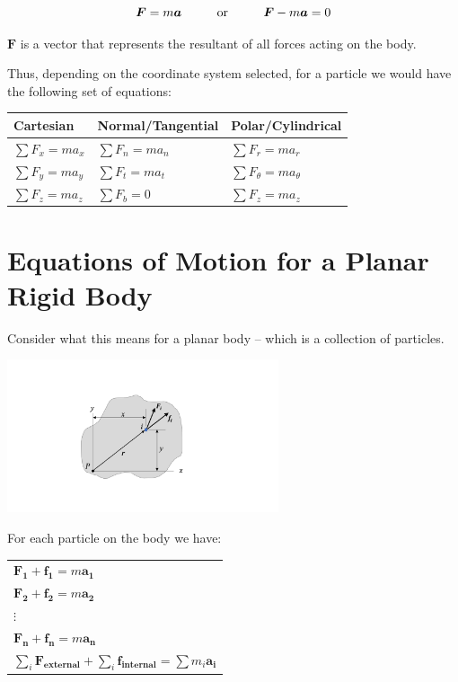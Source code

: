 \documentclass[12pt,letterpaper,twoside]{report}
\begin{document}
\vspace*{7\baselineskip}

\[ 
\bm{F} = m\bm{a} \hspace{1 cm} \text{or} \hspace{1 cm} \bm{F} - m\bm{a} = 0
\]

$\bm{F}$ is a vector that represents the resultant of all forces acting on the body.  

Thus, depending on the coordinate system selected, for a particle we would have the following set of equations:

\begin{center}
\begin{tabu} to 1\textwidth {  | X[1, c]  | X[1, c] | X[1, c] | }
\hline
Cartesian & Normal/Tangential & Polar/Cylindrical\\
\hline
$\sum F_x = m a_x $ & $\sum F_n = m a_n $ & $\sum F_r = m a_r $\\
$\sum F_y = m a_y$ & $\sum F_t = m a_t$ & $\sum F_{\theta} = m a_{\theta}$\\
$\sum F_z = m a_z$ & $\sum F_b = 0$ &$\sum F_z = m a_z$ \\
\hline
\end{tabu}
\end{center}

\newpage

\section{Equations of Motion for a Planar Rigid Body}
Consider what this means for a planar body – which is a collection of particles. 

\includegraphics[trim={5cm 1cm 5cm 1cm},clip,width=0.6\textwidth, center]{Slide50} 

For each particle on the body we have:
\begin{center}
\begin{tabu} to .5\textwidth {   X[1, c]   }

$ \bm{F_1} + \bm{f_1} = m \bm{a_1} $ \\
$ \bm{F_2} + \bm{f_2} = m \bm{a_2} $\\
 $\vdots$  \\
$ \bm{F_n} + \bm{f_n} = m \bm{a_n} $ \\
\hline
$ \displaystyle \sum_i \bm{F_{external}} + \sum_i \bm{f_{internal}} = \sum m_i \bm{a_i} $
\end{tabu}
\end{center}
\end{document}
